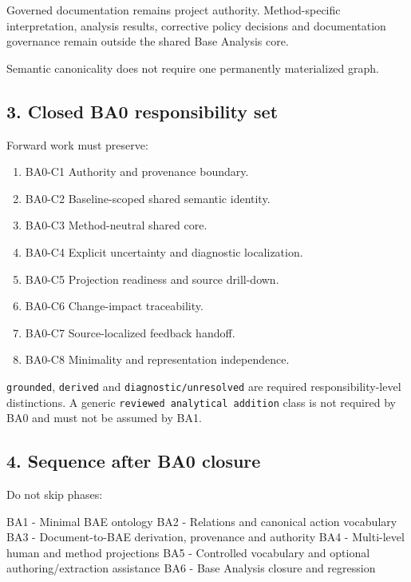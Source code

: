 \documentclass[
  10pt,
]{article}
\newenvironment{Shaded}{}{}
\newcommand{\NormalTok}[1]{#1}
\providecommand{\tightlist}{%
  \setlength{\itemsep}{0pt}\setlength{\parskip}{0pt}}
\begin{document}
Governed documentation remains project authority. Method-specific
interpretation, analysis results, corrective policy decisions and
documentation governance remain outside the shared Base Analysis core.

Semantic canonicality does not require one permanently materialized
graph.

\subsection{3. Closed BA0 responsibility
set}\label{closed-ba0-responsibility-set}

Forward work must preserve:

\begin{enumerate}
\def\labelenumi{\arabic{enumi}.}
\tightlist
\item
  BA0-C1 Authority and provenance boundary.
\item
  BA0-C2 Baseline-scoped shared semantic identity.
\item
  BA0-C3 Method-neutral shared core.
\item
  BA0-C4 Explicit uncertainty and diagnostic localization.
\item
  BA0-C5 Projection readiness and source drill-down.
\item
  BA0-C6 Change-impact traceability.
\item
  BA0-C7 Source-localized feedback handoff.
\item
  BA0-C8 Minimality and representation independence.
\end{enumerate}

\texttt{grounded}, \texttt{derived} and \texttt{diagnostic/unresolved}
are required responsibility-level distinctions. A generic
\texttt{reviewed\ analytical\ addition} class is not required by BA0 and
must not be assumed by BA1.

\subsection{4. Sequence after BA0
closure}\label{sequence-after-ba0-closure}

Do not skip phases:

\begin{Shaded}
\begin{Highlighting}[]
\NormalTok{BA1 {-} Minimal BAE ontology}
\NormalTok{BA2 {-} Relations and canonical action vocabulary}
\NormalTok{BA3 {-} Document{-}to{-}BAE derivation, provenance and authority}
\NormalTok{BA4 {-} Multi{-}level human and method projections}
\NormalTok{BA5 {-} Controlled vocabulary and optional authoring/extraction assistance}
\NormalTok{BA6 {-} Base Analysis closure and regression}
\end{Highlighting}
\end{Shaded}
\end{document}
